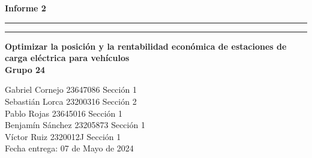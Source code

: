 \documentclass[letterpaper]{article}
\begin{document}
	\begin{center}{}
		\vspace*{2mm}
		{\Huge\bf Informe 2}\\
		\vspace*{4mm}
		\hrule\vspace*{1pt}\hrule
		\vspace*{4mm}
		{\LARGE\bf Optimizar la posición y la rentabilidad económica de estaciones de carga eléctrica para vehículos }\\
		\vspace*{4mm}
		{\huge\bf Grupo 24 }\\
		\vspace*{1mm}
	\end{center}
	
	\vspace*{30mm}
	\flushright 
	
	Gabriel Cornejo 23647086 Sección 1\\
	Sebastián Lorca 23200316 Sección 2\\
	Pablo Rojas 23645016 Sección 1\\
	Benjamín Sánchez  23205873 Sección 1\\
	Víctor Ruiz 2320012J Sección 1\\
	
	
	\vspace*{5mm}
	{\large Fecha entrega: 07 de Mayo de 2024\\}
	
	\newpage
	\begin{flushleft}
		\tableofcontents
	\end{flushleft}
	
\end{document}
